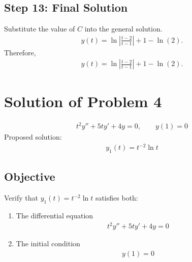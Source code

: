\documentclass[letterpaper,10pt,english]{sphinxmanual}
\begin{document}
\subsection{Step 13: Final Solution}
\label{\detokenize{Language/Science_language/ODE_calculus/course_MATH_3035/homework_assignments/index_pdf:step-13-final-solution}}
\sphinxAtStartPar
Substitute the value of \(C\) into the general solution.
\begin{equation*}
\begin{split}y(t)
=
\ln\left|
\frac{t-2}{t-1}
\right|
+1-\ln(2).\end{split}
\end{equation*}
\sphinxAtStartPar
Therefore,
\begin{equation*}
\begin{split}\boxed{
y(t)
=
\ln\left|
\frac{t-2}{t-1}
\right|
+1-\ln(2)
}.\end{split}
\end{equation*}



\section{Solution of Problem 4}
\label{\detokenize{Language/Science_language/ODE_calculus/course_MATH_3035/homework_assignments/index_pdf:solution-of-problem-4}}
\sphinxAtStartPar
{}
\begin{equation*}
\begin{split}t^2y'' + 5ty' + 4y = 0,
\qquad
y(1)=0\end{split}
\end{equation*}
\sphinxAtStartPar
Proposed solution:
\begin{equation*}
\begin{split}y_1(t)=t^{-2}\ln t\end{split}
\end{equation*}

\subsection{Objective}
\label{\detokenize{Language/Science_language/ODE_calculus/course_MATH_3035/homework_assignments/index_pdf:objective}}
\sphinxAtStartPar
Verify that \(y_1(t)=t^{-2}\ln t\) satisfies both:
\begin{enumerate}
%
\item {} 
\sphinxAtStartPar
The differential equation
\begin{equation*}
\begin{split}t^2y'' + 5ty' + 4y = 0\end{split}
\end{equation*}
\item {} 
\sphinxAtStartPar
The initial condition
\begin{equation*}
\begin{split}y(1)=0\end{split}
\end{equation*}
\end{enumerate}
\end{document}
